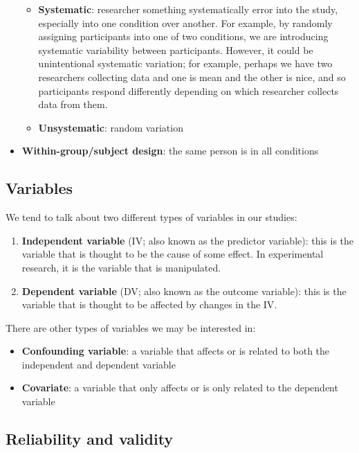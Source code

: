 \documentclass[
]{book}
\providecommand{\tightlist}{%
  \setlength{\itemsep}{0pt}\setlength{\parskip}{0pt}}
\begin{document}
\begin{itemize}
  \begin{itemize}
  \tightlist
  \item
    \textbf{Systematic}: researcher something systematically error into the study, especially into one condition over another. For example, by randomly assigning participants into one of two conditions, we are introducing systematic variability between participants. However, it could be unintentional systematic variation; for example, perhaps we have two researchers collecting data and one is mean and the other is nice, and so participants respond differently depending on which researcher collects data from them.
  \item
    \textbf{Unsystematic}: random variation
  \end{itemize}
\item
  \textbf{Within-group/subject design}: the same person is in all conditions
\end{itemize}

\hypertarget{variables}{%
\subsection{Variables}\label{variables}}

We tend to talk about two different types of variables in our studies:

\begin{enumerate}
\def\labelenumi{\arabic{enumi}.}
\item
  \textbf{Independent variable} (IV; also known as the predictor variable): this is the variable that is thought to be the cause of some effect. In experimental research, it is the variable that is manipulated.
\item
  \textbf{Dependent variable} (DV; also known as the outcome variable): this is the variable that is thought to be affected by changes in the IV.
\end{enumerate}

There are other types of variables we may be interested in:

\begin{itemize}
\item
  \textbf{Confounding variable}: a variable that affects or is related to both the independent and dependent variable
\item
  \textbf{Covariate}: a variable that only affects or is only related to the dependent variable
\end{itemize}

\hypertarget{reliability-and-validity}{%
\subsection{Reliability and validity}\label{reliability-and-validity}}
\end{document}

